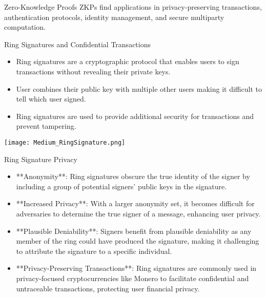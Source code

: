 \begin{withoutheadline}
\begin{frame}{Zero-Knowledge Proofs}
    ZKPs find applications in privacy-preserving transactions, authentication protocols, identity management, and secure multiparty computation.
\end{frame}

\begin{frame}{Ring Signatures and Confidential Transactions}
    \begin{itemize}
        \item Ring signatures are a cryptographic protocol that enables users to sign transactions without revealing their private keys.
        \item User combines their public key with multiple other users making it difficult to tell which user signed.
        \item Ring signatures are used to provide additional security for transactions and prevent tampering.
    \end{itemize}
    \texttt{[image: Medium\_RingSignature.png]}
\end{frame}

\begin{frame}{Ring Signature Privacy}
    \begin{itemize}
        \item **Anonymity**: Ring signatures obscure the true identity of the signer by including a group of potential signers' public keys in the signature.
        \item **Increased Privacy**: With a larger anonymity set, it becomes difficult for adversaries to determine the true signer of a message, enhancing user privacy.
        \item **Plausible Deniability**: Signers benefit from plausible deniability as any member of the ring could have produced the signature, making it challenging to attribute the signature to a specific individual.
        \item **Privacy-Preserving Transactions**: Ring signatures are commonly used in privacy-focused cryptocurrencies like Monero to facilitate confidential and untraceable transactions, protecting user financial privacy.
    \end{itemize}
\end{frame}


\end{withoutheadline}

